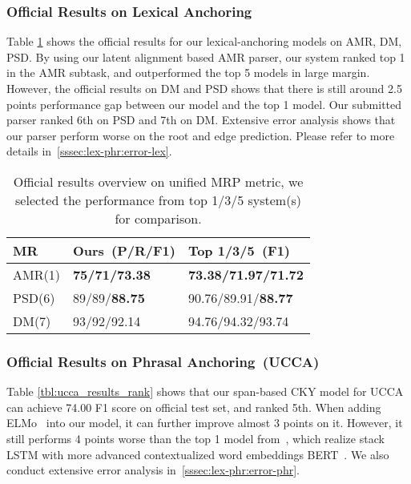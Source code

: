 \subsubsection{Official Results on Lexical Anchoring}
\label{sssec:lex-phr:lex-results}
Table \ref{tbl:results_rank} shows the official results for our
lexical-anchoring models on AMR, DM, PSD.  By using our latent
alignment based AMR parser, our system ranked top 1 in the AMR
subtask, and outperformed the top 5 models in large margin. However,
the official results on DM and PSD shows that there is still around
2.5 points performance gap between our model and the top 1 model. Our
submitted parser ranked 6th on PSD and 7th on DM. Extensive error
analysis shows that our parser perform worse on the root and edge
prediction. Please refer to more details
in~\autoref{sssec:lex-phr:error-lex}.

\begin{table}[!tbp]
\caption{\label{tbl:results_rank} Official results overview on unified MRP metric, we selected the performance from top 1/3/5 system(s) for comparison.}
\centering
\begin{tabular}{lll}
\toprule
MR     & Ours~(P/R/F1) & Top 1/3/5~(F1)  \\ \hline
AMR(1) & {\bf 75/71/73.38}   & {\bf 73.38/71.97/71.72} \\
PSD(6) & 89/89/{\bf 88.75}   & 90.76/89.91/{\bf 88.77} \\
DM(7)  & 93/92/92.14   & 94.76/94.32/93.74 \\ \hline
\end{tabular}
\end{table}

\subsubsection{Official Results on Phrasal Anchoring~(UCCA)}
\label{sssec:lex-phr:ucca-results}
Table \ref{tbl:ucca_results_rank} shows that our span-based CKY model
for UCCA can achieve 74.00 F1 score on official test set, and ranked
5th. When adding ELMo~\cite{peters2018deep} into our model, it can
further improve almost 3 points on it. However, it still performs 4
points worse than the top 1 model from~\cite{Che:Dou:Xu:19}, which
realize stack LSTM with more advanced contextualized word embeddings
BERT~\cite{devlin2019bert}. We also conduct extensive error analysis
in~\autoref{sssec:lex-phr:error-phr}.

